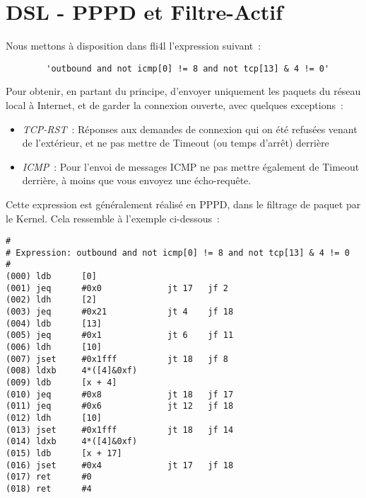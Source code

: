 
{
\section {DSL - PPPD et Filtre-Actif}
}


Nous mettons à disposition dans fli4l l'expression suivant~:
\begin{example}
\begin{verbatim}
        'outbound and not icmp[0] != 8 and not tcp[13] & 4 != 0'
\end{verbatim}
\end{example}
Pour obtenir, en partant du principe, d'envoyer uniquement les paquets 
du réseau local à Internet, et de garder la connexion ouverte, avec 
quelques exceptions~:
\begin{itemize}
\item \emph{TCP-RST}~: Réponses aux demandes de connexion qui on été refusées 
  venant de l'extérieur, et ne pas mettre de Timeout (ou temps d'arrêt) derrière 
\item \emph{ICMP}~: Pour l'envoi de messages ICMP ne pas mettre également 
  de Timeout derrière, à moins que vous envoyez une écho-requête.
\end{itemize}

Cette expression est généralement réalisé en PPPD, dans le filtrage de paquet par
le Kernel. Cela ressemble à l'exemple ci-dessous~:

\begin{example}
\begin{verbatim}
#
# Expression: outbound and not icmp[0] != 8 and not tcp[13] & 4 != 0
#
(000) ldb      [0]
(001) jeq      #0x0             jt 17   jf 2
(002) ldh      [2]
(003) jeq      #0x21            jt 4    jf 18
(004) ldb      [13]
(005) jeq      #0x1             jt 6    jf 11
(006) ldh      [10]
(007) jset     #0x1fff          jt 18   jf 8
(008) ldxb     4*([4]&0xf)
(009) ldb      [x + 4]
(010) jeq      #0x8             jt 18   jf 17
(011) jeq      #0x6             jt 12   jf 18
(012) ldh      [10]
(013) jset     #0x1fff          jt 18   jf 14
(014) ldxb     4*([4]&0xf)
(015) ldb      [x + 17]
(016) jset     #0x4             jt 17   jf 18
(017) ret      #0
(018) ret      #4
\end{verbatim}
\end{example}

